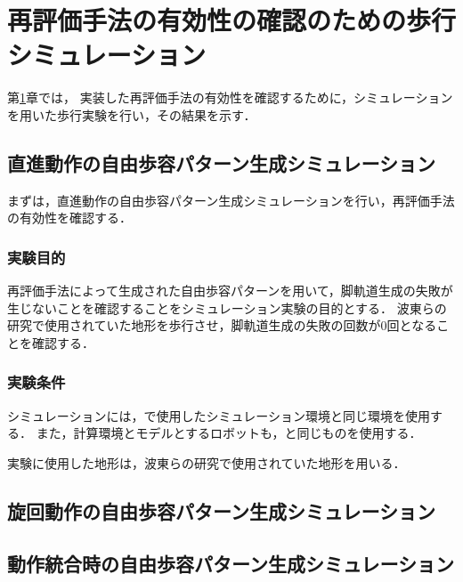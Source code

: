 ﻿

\chapter{再評価手法の有効性の確認のための歩行シミュレーション}\label{chapter:再評価手法の有効性の確認のための歩行シミュレーション}
第\ref{chapter:再評価手法の有効性の確認のための歩行シミュレーション}章では，
実装した再評価手法の有効性を確認するために，シミュレーションを用いた歩行実験を行い，その結果を示す．

\section{直進動作の自由歩容パターン生成シミュレーション}
まずは，直進動作の自由歩容パターン生成シミュレーションを行い，再評価手法の有効性を確認する．

\subsection{実験目的}
再評価手法によって生成された自由歩容パターンを用いて，脚軌道生成の失敗が生じないことを確認することをシミュレーション実験の目的とする．
波東らの研究で使用されていた地形を歩行させ，脚軌道生成の失敗の回数が0回となることを確認する．

\subsection{実験条件}
シミュレーションには，で使用したシミュレーション環境と同じ環境を使用する．
また，計算環境とモデルとするロボットも，と同じものを使用する．

実験に使用した地形は，波東らの研究で使用されていた地形を用いる．

\section{旋回動作の自由歩容パターン生成シミュレーション}

\section{動作統合時の自由歩容パターン生成シミュレーション}